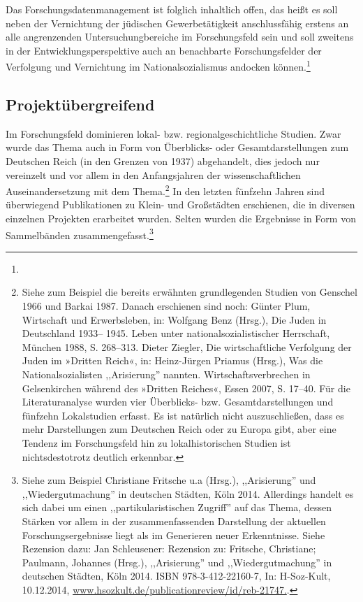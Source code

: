 Das Forschungsdatenmanagement ist folglich inhaltlich offen, das heißt es soll neben der Vernichtung der jüdischen Gewerbetätigkeit anschlussfähig erstens an alle angrenzenden Untersuchungbereiche im Forschungsfeld sein und soll zweitens in der Entwicklungsperspektive auch an benachbarte Forschungsfelder der Verfolgung und Vernichtung im Nationalsozialismus andocken können.\footnote{} 

\subsection{Projektübergreifend}

Im Forschungsfeld dominieren lokal- bzw. regionalgeschichtliche Studien. Zwar wurde das Thema auch in Form von Überblicks- oder Gesamtdarstellungen zum Deutschen Reich (in den Grenzen von 1937) abgehandelt, dies jedoch nur vereinzelt und vor allem in den Anfangsjahren der wissenschaftlichen Auseinandersetzung mit dem Thema.\footnote{Siehe zum Beispiel die bereits erwähnten grundlegenden Studien von Genschel 1966 und Barkai 1987. Danach erschienen sind noch: Günter
Plum, Wirtschaft und Erwerbsleben, in: Wolfgang Benz (Hrsg.), Die Juden in Deutschland 1933–
1945. Leben unter nationalsozialistischer Herrschaft, München 1988, S. 268–313. Dieter Ziegler, Die wirtschaftliche
Verfolgung der Juden im »Dritten Reich«, in: Heinz-Jürgen Priamus (Hrsg.), Was die
Nationalsozialisten ,,Arisierung'' nannten. Wirtschaftsverbrechen in Gelsenkirchen während des
»Dritten Reiches«, Essen 2007, S. 17–40. Für die Literaturanalyse wurden vier Überblicks- bzw. Gesamtdarstellungen und fünfzehn Lokalstudien erfasst. Es ist natürlich nicht auszuschließen, dass es mehr Darstellungen zum Deutschen Reich oder zu Europa gibt, aber eine Tendenz im Forschungsfeld hin zu lokalhistorischen Studien ist nichtsdestotrotz deutlich erkennbar.} In den letzten fünfzehn Jahren sind überwiegend Publikationen zu Klein- und Großstädten erschienen, die in diversen einzelnen Projekten erarbeitet wurden. Selten wurden die Ergebnisse in Form von Sammelbänden zusammengefasst.\footnote{Siehe zum Beispiel Christiane Fritsche u.a (Hrsg.), ,,Arisierung'' und ,,Wiedergutmachung'' in deutschen Städten, Köln 2014. Allerdings handelt es sich dabei um einen ,,partikularistischen Zugriff'' auf das Thema, dessen Stärken vor allem in der zusammenfassenden Darstellung der aktuellen Forschungsergebnisse liegt als im Generieren neuer Erkenntnisse. Siehe Rezension dazu: Jan Schleusener: Rezension zu: Fritsche, Christiane; Paulmann, Johannes (Hrsg.), ,,Arisierung'' und ,,Wiedergutmachung'' in deutschen Städten, Köln  2014. ISBN 978-3-412-22160-7, In: H-Soz-Kult, 10.12.2014, \url{www.hsozkult.de/publicationreview/id/reb-21747.}.} 


